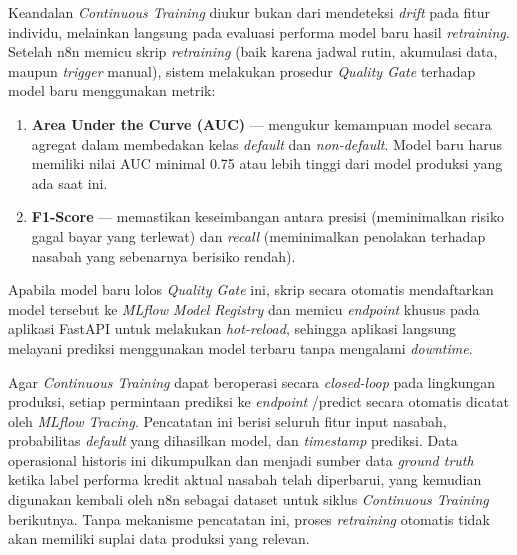 

Keandalan \textit{Continuous Training} diukur bukan dari mendeteksi \textit{drift} pada fitur individu, melainkan langsung pada evaluasi performa model baru hasil \textit{retraining}. Setelah n8n memicu skrip \textit{retraining} (baik karena jadwal rutin, akumulasi data, maupun \textit{trigger} manual), sistem melakukan prosedur \textit{Quality Gate} terhadap model baru menggunakan metrik:

\begin{enumerate}
    \item \textbf{Area Under the Curve (AUC)} --- mengukur kemampuan model secara agregat dalam membedakan kelas \textit{default} dan \textit{non-default}. Model baru harus memiliki nilai AUC minimal 0.75 atau lebih tinggi dari model produksi yang ada saat ini.
    \item \textbf{F1-Score} --- memastikan keseimbangan antara presisi (meminimalkan risiko gagal bayar yang terlewat) dan \textit{recall} (meminimalkan penolakan terhadap nasabah yang sebenarnya berisiko rendah).
\end{enumerate}

Apabila model baru lolos \textit{Quality Gate} ini, skrip secara otomatis mendaftarkan model tersebut ke \textit{MLflow Model Registry} dan memicu \textit{endpoint} khusus pada aplikasi FastAPI untuk melakukan \textit{hot-reload}, sehingga aplikasi langsung melayani prediksi menggunakan model terbaru tanpa mengalami \textit{downtime}.

Agar \textit{Continuous Training} dapat beroperasi secara \textit{closed-loop} pada lingkungan produksi, setiap permintaan prediksi ke \textit{endpoint} /predict secara otomatis dicatat oleh \textit{MLflow Tracing}. Pencatatan ini berisi seluruh fitur input nasabah, probabilitas \textit{default} yang dihasilkan model, dan \textit{timestamp} prediksi. Data operasional historis ini dikumpulkan dan menjadi sumber data \textit{ground truth} ketika label performa kredit aktual nasabah telah diperbarui, yang kemudian digunakan kembali oleh n8n sebagai dataset untuk siklus \textit{Continuous Training} berikutnya. Tanpa mekanisme pencatatan ini, proses \textit{retraining} otomatis tidak akan memiliki suplai data produksi yang relevan.

